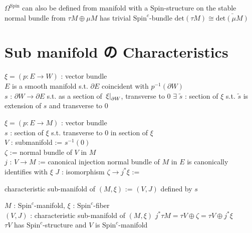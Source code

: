 \documentclass[dvipdfmx]{jsarticle}
\begin{document}
\begin{Theorem}
\itemprop
  \Then \(\Omega^{\text{Spin}}\) can also be defined from manifold with a \(\text{Spin}\)-structure on the stable normal bundle
\itemprop
  \Then from \(\tau M \oplus \mu M\) has trivial \(\text{Spin}^c\)-bundle \(\text{det}(\tau M) \cong \bar{\text{det}(\mu M)}\)
\end{Theorem}

\section*{Sub manifold の Characteristics}

\begin{Theorem}
\itemwhen
  \For \(\xi = (p : E \to W)\) : vector bundle \\
  \IfHold \(E\) is a smooth manifold s.t. \(\partial E\) coincident with \(p^{-1}(\partial W)\) \\
  \For \(s\) : \(\partial W \to \partial E\) s.t. as a section of \(\left. {\xi} \right| _{\partial W}\), transverse to \(0\)
\itemprop
  \Then \(\exists\) \(\tilde{s}\) : section of \(\xi\) s.t. \(\tilde{s}\) is extension of \(s\) and transverse to \(0\)
\end{Theorem}

\begin{Definition}
\itemwhen
  \For \(\xi = (p : E \to M)\) : vector bundle \\
  \For \(s\) : section of \(\xi\) s.t. transverse to \(0\) in section of \(\xi\) \\
  \Let \(V\) : submanifold := \(s^{-1}(0)\) \\
  \Let \(\zeta\) := normal bundle of \(V\) in \(M\) \\
  \Let \(j\) : \(V \to M\) := canonical injection
\itemnote
  \Then normal bundle of \(M\) in \(E\) is canonically identifies with \(\xi\)
\itemdefi
  \Define \(J\) : isomorphism \(\zeta \to j^* \xi\) := 
\end{Definition}

\begin{Definition}
\itemdefi
  \Define characteristic sub-manifold of \((M,\xi)\) := \((V,J)\) defined by \(s\)
\end{Definition}

\begin{Theorem}
\itemwhen
  \For \(M\) : \(\text{Spin}^c\)-manifold, \(\xi\) : \(\text{Spin}^c\)-fiber \\
  \For \((V,J)\) : characteristic sub-manifold of \((M,\xi)\)
\itemprop
  \Then \(j^* \tau M = \tau V \oplus \zeta = \tau V \oplus j^* \xi\) \\
  \Then \(\tau V\) has \(\text{Spin}^c\)-structure and \(V\) is \(\text{Spin}^c\)-manifold
\end{Theorem}
\end{document}
